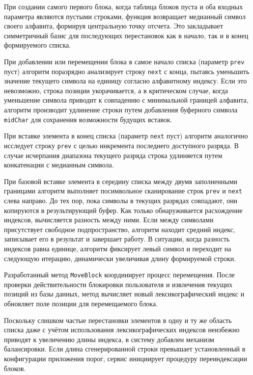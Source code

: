 \documentclass[coursework]{SCWorks}
\begin{document}
При создании самого первого блока, когда таблица блоков пуста и оба входных параметра являются пустыми строками, функция возвращает медианный символ своего алфавита, формируя центральную точку отсчета. Это закладывает симметричный базис для последующих перестановок как в начало, так и в конец формируемого списка.

При добавлении или перемещении блока в самое начало списка (параметр \texttt{prev} пуст) алгоритм поразрядно анализирует строку \texttt{next} с конца, пытаясь уменьшить значение текущего символа на единицу согласно алфавитному индексу. Если это невозможно, строка позиции укорачивается, а в критическом случае, когда уменьшение символа приводит к совпадению с минимальной границей алфавита, алгоритм производит удлинение строки путем добавления буферного символа \texttt{midChar} для сохранения возможности будущих вставок.

При вставке элемента в конец списка (параметр \texttt{next} пуст) алгоритм аналогично исследует строку \texttt{prev} с целью инкремента последнего доступного разряда. В случае исчерпания диапазона текущего разряда строка удлиняется путем конкатенации с медианным символа.

При базовой вставке элемента в середину списка между двумя заполненными границами алгоритм выполняет посимвольное сканирование строк \texttt{prev} и \texttt{next} слева направо. До тех пор, пока символы в текущих разрядах совпадают, они копируются в результирующий буфер. Как только обнаруживается расхождение индексов, вычисляется разность между ними. Если между символами присутствует свободное подпространство, алгоритм находит средний индекс, записывает его в результат и завершает работу. В ситуации, когда разность индексов равна единице, алгоритм фиксирует левый символ и переходит на следующую итерацию, динамически увеличивая длину формируемой строки.

Разработанный метод \texttt{MoveBlock} координирует процесс перемещения. После проверки действительности блокировки пользователя и извлечения текущих позиций из базы данных, метод вычисляет новый лексикографический индекс и обновляет поле позиции для перемещаемого блока.

Поскольку слишком частые перестановки элементов в одну и ту же область списка даже с учётом использования лексикографических индексов неизбежно приводят к увеличению длины индекса, в систему добавлен механизм балансировки. Если длина сгенерированной строки превышает установленный в конфигурации приложения порог, сервис инициирует процедуру переиндексации блоков.
\end{document}
